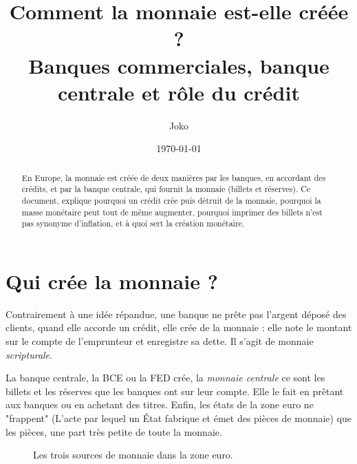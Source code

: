 \documentclass[11pt,a4paper]{article}
\title{\textbf{Comment la monnaie est-elle créée ?}\\[4pt]
\large Banques commerciales, banque centrale et rôle du crédit}
\author{\int Joko}
\date{\today}
\begin{document}
\maketitle

\begin{abstract}
\noindent En Europe, la monnaie est créée de deux manières par les banques, en accordant des crédits, et par la banque centrale, qui fournit la monnaie (billets et réserves). Ce document, explique pourquoi un crédit crée puis détruit de la monnaie, pourquoi la masse monétaire peut tout de même augmenter, pourquoi imprimer des billets n'est pas synonyme d'inflation, et à quoi sert la création monétaire.
\end{abstract}

\section{Qui crée la monnaie ?}

Contrairement à une idée répandue, une banque ne prête pas l'argent déposé des clients, quand elle accorde un crédit, elle crée de la monnaie : elle note le montant sur le compte de l'emprunteur et enregistre sa dette. Il s'agit de monnaie \emph{scripturale}.

La banque centrale, la BCE ou la FED crée, la \emph{monnaie centrale} ce sont les billets et les réserves que les banques ont sur leur compte. Elle le fait en prêtant aux banques ou en achetant des titres. Enfin, les états de la zone euro ne "frappent" (L'acte par lequel un État fabrique et émet des pièces de monnaie) que les pièces, une part très petite de toute la monnaie.

\begin{figure}[H]
\centering
{}
\caption{Les trois sources de monnaie dans la zone euro.}
\label{fig:sources}
\end{figure}
\end{document}
